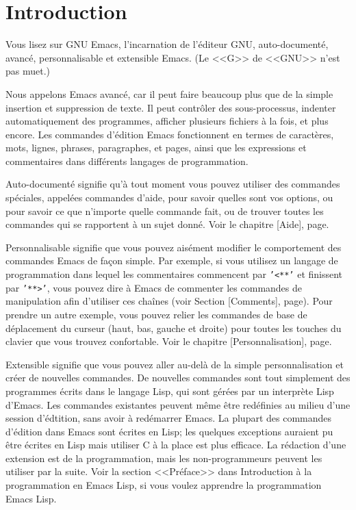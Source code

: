 {}
\section*{Introduction}\label{introduction}
Vous lisez sur GNU Emacs, l'incarnation de l'éditeur GNU,
auto-documenté, avancé, personnalisable et extensible Emacs. (Le <<G>>
de <<GNU>> n'est pas muet.)\par 

Nous appelons Emacs avancé, car il peut faire beaucoup plus que de la
simple insertion et suppression de texte. Il peut contrôler des
sous-processus, indenter automatiquement des programmes, afficher
plusieurs fichiers à la fois, et plus encore. Les commandes d'édition
Emacs fonctionnent en termes de caractères, mots, lignes, phrases,
paragraphes, et pages, ainsi que les expressions et commentaires dans
différents langages de programmation.\par 

Auto-documenté signifie qu'à tout moment vous pouvez utiliser des
commandes spéciales, appelées commandes d'aide, pour savoir quelles
sont vos options, ou pour savoir ce que n'importe quelle commande
fait, ou de trouver toutes les commandes qui se rapportent à un sujet
donné. Voir le chapitre [Aide], page.\par 

Personnalisable signifie que vous pouvez aisément modifier le
comportement des commandes Emacs de façon simple. Par exemple, si vous
utilisez un langage de programmation dans lequel les commentaires
commencent par \texttt{'<**'} et finissent par \texttt{'**>'}, vous
pouvez dire à Emacs de commenter les commandes de manipulation afin
d'utiliser ces chaînes (voir Section [Comments],
page). Pour prendre un autre exemple, vous pouvez
relier les commandes de base de déplacement du curseur (haut, bas,
gauche et droite) pour toutes les touches du clavier que vous trouvez
confortable. Voir le chapitre [Personnalisation],
page.\par  

Extensible signifie que vous pouvez aller au-delà de la simple
personnalisation et créer de nouvelles commandes. De nouvelles
commandes sont tout simplement des programmes écrits dans le langage
Lisp, qui sont gérées par un interprète Lisp d'Emacs. Les commandes
existantes peuvent même être redéfinies au milieu d'une session
d'édtition, sans avoir à redémarrer Emacs. La plupart des commandes
d'édition dans Emacs sont écrites en Lisp; les quelques exceptions
auraient pu être écrites en Lisp mais utiliser C à la place est plus
efficace. La rédaction d'une extension est de la programmation, mais
les non-programmeurs peuvent les utiliser par la suite. Voir la
section <<Préface>> dans Introduction à la programmation en Emacs
Lisp, si vous voulez apprendre la programmation Emacs Lisp. \par



